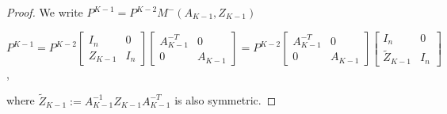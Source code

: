 \documentclass[10pt,a4paper]{amsart}
\begin{document}
\begin{proof}
We write $P^{K-1} = P^{K-2} M^-(A_{K-1}, Z_{K-1})$
\begin{center} \label{P^K-1}
    $P^{K-1} = P^{K-2} \left[\begin{array}{ccc} I_n & 0 \\ Z_{K-1} & I_n\end{array}\right] \left[\begin{array}{ccc} A^{-T}_{K-1} & 0 \\ 0 & A_{K-1}\end{array}\right] = P^{K-2} \left[\begin{array}{ccc} A^{-T}_{K-1} & 0 \\ 0 & A_{K-1}\end{array}\right] \left[\begin{array}{ccc} I_n & 0 \\ \tilde{Z}_{K-1} & I_n\end{array}\right]$,
\end{center}
where $\tilde{Z}_{K-1}:= A_{K-1}^{-1} Z_{K-1} A_{K-1}^{-T}$ is also symmetric. 



\end{proof}
\end{document}

